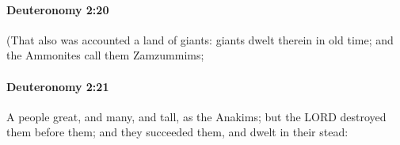 		\paragraph{Deuteronomy 2:20} %
			\label{DEUTERONOMY-2-20}

			(That also was accounted a land of giants: giants dwelt therein in old time; and the Ammonites call them Zamzummims;


		\paragraph{Deuteronomy 2:21} %
			\label{DEUTERONOMY-2-21}

			A people great, and many, and tall, as the Anakims; but the LORD destroyed them before them; and they succeeded them, and dwelt in their stead:


